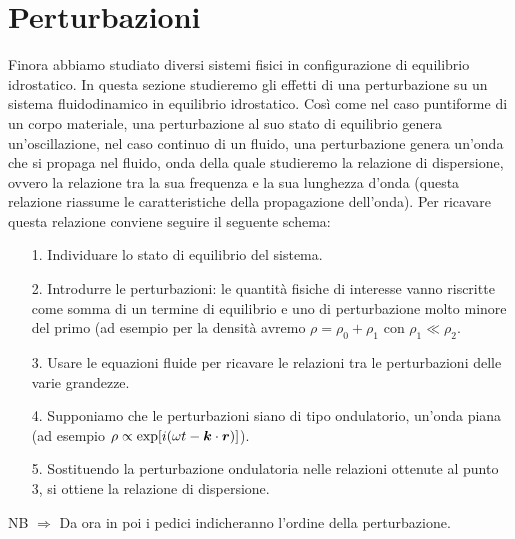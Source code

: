 \section{Perturbazioni}
Finora abbiamo studiato diversi sistemi fisici in configurazione di equilibrio idrostatico. In questa sezione studieremo gli effetti di una perturbazione su un sistema fluidodinamico in equilibrio idrostatico. Così come nel caso puntiforme di un corpo materiale, una perturbazione al suo stato di equilibrio genera un'oscillazione, nel caso continuo di un fluido, una perturbazione genera un'onda che si propaga nel fluido, onda della quale studieremo la relazione di dispersione, ovvero la relazione tra la sua frequenza e la sua lunghezza d'onda (questa relazione riassume le caratteristiche della propagazione dell'onda). Per ricavare questa relazione conviene seguire il seguente schema:
\begin{itemize}
\item[1.] Individuare lo stato di equilibrio del sistema.
\item[2.] Introdurre le perturbazioni: le quantità fisiche di interesse vanno riscritte come somma di un termine di equilibrio e uno di perturbazione  molto minore del primo (ad esempio per la densità avremo $\rho = \rho_0 + \rho_1$ con $\rho_1 \ll \rho_2$.
\item[3.] Usare le equazioni fluide per ricavare le relazioni tra le perturbazioni delle varie grandezze.
\item[4.] Supponiamo che le perturbazioni siano di tipo ondulatorio, un'onda piana (ad esempio $\rho \propto \exp [i(\omega t - \scal{k}{r})]$).
\item[5.] Sostituendo la perturbazione ondulatoria nelle relazioni ottenute al punto 3, si ottiene la relazione di dispersione.
\end{itemize}
NB $\Longrightarrow$ Da ora in poi i pedici indicheranno l'ordine della perturbazione.

